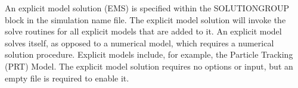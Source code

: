 An explicit model solution (EMS) is specified within the SOLUTIONGROUP block in the simulation name file.  The explicit model solution will invoke the solve routines for all explicit models that are added to it.  An explicit model solves itself, as opposed to a numerical model, which requires a numerical solution procedure.  Explicit models include, for example, the Particle Tracking (PRT) Model.  The explicit model solution requires no options or input, but an empty file is required to enable it.